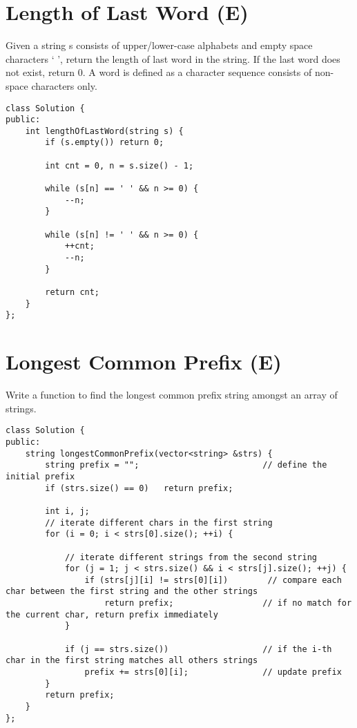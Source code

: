 \section{Length of Last Word (E)}
Given a string s consists of upper/lower-case alphabets and empty space characters ` ', return the length of last word in the string. If the last word does not exist, return 0. A word is defined as a character sequence consists of non-space characters only. \\

\begin{lstlisting}
class Solution {
public:
    int lengthOfLastWord(string s) {
        if (s.empty()) return 0;
        
        int cnt = 0, n = s.size() - 1;
        
        while (s[n] == ' ' && n >= 0) {
            --n;
        }
        
        while (s[n] != ' ' && n >= 0) {
            ++cnt;
            --n;
        }
        
        return cnt;
    }
};
\end{lstlisting}


\section{Longest Common Prefix (E)}
Write a function to find the longest common prefix string amongst an array of strings. \\

\begin{lstlisting}
class Solution {
public:
    string longestCommonPrefix(vector<string> &strs) {
        string prefix = "";                         // define the initial prefix
        if (strs.size() == 0)   return prefix;
        
        int i, j;
        // iterate different chars in the first string
        for (i = 0; i < strs[0].size(); ++i) { 
            
            // iterate different strings from the second string
            for (j = 1; j < strs.size() && i < strs[j].size(); ++j) {     
                if (strs[j][i] != strs[0][i])        // compare each char between the first string and the other strings
                    return prefix;                  // if no match for the current char, return prefix immediately
            }
            
            if (j == strs.size())                   // if the i-th char in the first string matches all others strings
                prefix += strs[0][i];               // update prefix
        }
        return prefix;
    }
};
\end{lstlisting}


